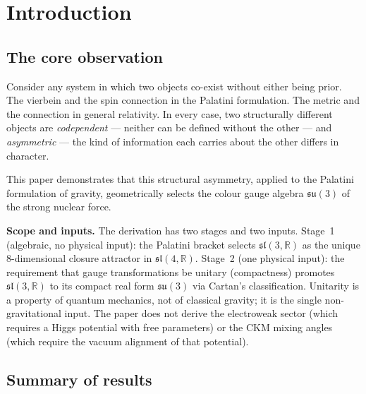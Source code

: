 \documentclass[11pt,a4paper]{article}
\theoremstyle{plain}
\theoremstyle{definition}
\theoremstyle{remark}
\begin{document}
\section{Introduction}
\label{sec:intro}

\subsection{The core observation}

Consider any system in which two objects co-exist without either being prior.
The vierbein and the spin connection in the Palatini formulation.
The metric and the connection in general relativity.
In every case, two structurally different objects are \emph{codependent} ---
neither can be defined without the other --- and \emph{asymmetric} --- 
the kind of information each carries about the other differs in character.

This paper demonstrates that this structural asymmetry, applied to the
Palatini formulation of gravity, geometrically selects the colour gauge
algebra $\mathfrak{su}(3)$ of the strong nuclear force.

\textbf{Scope and inputs.}
The derivation has two stages and two inputs.
Stage~1 (algebraic, no physical input): the Palatini bracket selects
$\mathfrak{sl}(3,\mathbb{R})$ as the unique 8-dimensional closure
attractor in $\mathfrak{sl}(4,\mathbb{R})$.
Stage~2 (one physical input): the requirement that gauge transformations
be unitary (compactness) promotes $\mathfrak{sl}(3,\mathbb{R})$ to its
compact real form $\mathfrak{su}(3)$ via Cartan's classification.
Unitarity is a property of quantum mechanics, not of classical gravity;
it is the single non-gravitational input.  The paper does not derive
the electroweak sector (which requires a Higgs potential with free
parameters) or the CKM mixing angles (which require the vacuum
alignment of that potential).

\subsection{Summary of results}
\end{document}

